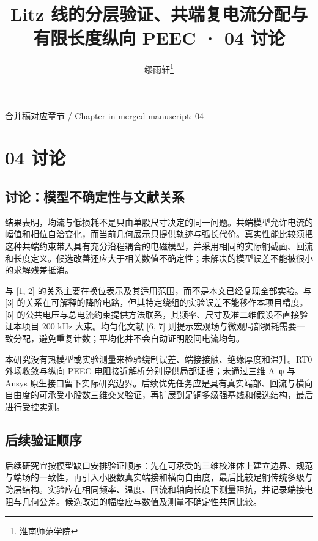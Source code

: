 \documentclass[journal,10pt]{IEEEtran}
\begin{document}
\title{Litz 线的分层验证、共端复电流分配与有限长度纵向 PEEC · 04 讨论}
\author{缪雨轩\thanks{淮南师范学院}}

\maketitle
\noindent 合并稿对应章节 / Chapter in merged manuscript: \href{paper_zh-CN_ieee.pdf#chapter-04}{04}\par
\FloatBarrier
\section*{04 讨论}
\hypertarget{chapter-04}{}
\subsection*{讨论：模型不确定性与文献关系}
\hypertarget{04.discussion.heading}{}
结果表明，均流与低损耗不是只由单股尺寸决定的同一问题。共端模型允许电流的幅值和相位自洽变化，而当前几何展示只提供轨迹与弧长代价。真实性能比较须把这种共端约束带入具有充分沿程耦合的电磁模型，并采用相同的实际铜截面、回流和长度定义。候选改善还应大于相关数值不确定性；未解决的模型误差不能被很小的求解残差抵消。


与 [1, 2] 的关系主要在换位表示及其适用范围，而不是本文已经复现全部实验。与 [3] 的关系在可解释的降阶电路，但其特定绕组的实验误差不能移作本项目精度。[5] 的公共电压与总电流约束提供方法联系，其频率、尺寸及准二维假设不直接验证本项目 200 kHz 大束。均匀化文献 [6, 7] 则提示宏观场与微观局部损耗需要一致分配，避免重复计数；平均化并不会自动证明股间电流均匀。


本研究没有热模型或实验测量来检验绕制误差、端接接触、绝缘厚度和温升。RT0 外场收敛与纵向 PEEC 电阻接近解析分别提供局部证据；未通过三维 A–φ 与 Ansys 原生接口留下实际研究边界。后续优先任务应是具有真实端部、回流与横向自由度的可承受小股数三维交叉验证，再扩展到足铜多级强基线和候选结构，最后进行受控实测。


\subsection*{后续验证顺序}
\hypertarget{04.recommendations.heading}{}
后续研究宜按模型缺口安排验证顺序：先在可承受的三维校准体上建立边界、规范与端场的一致性，再引入小股数真实端接和横向自由度，最后比较足铜传统多级与跨层结构。实验应在相同频率、温度、回流和轴向长度下测量阻抗，并记录端接电阻与几何公差。候选改进的幅度应与数值及测量不确定性共同比较。
\end{document}

